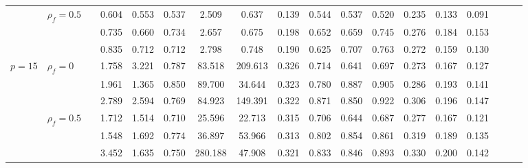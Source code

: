\documentclass[11pt,a4paper]{article}
\theoremstyle{definition}
\begin{document}
\begin{landscape}
\begin{center}
\begin{longtable}{lllccccccccccccccc}
\cmidrule(lr){4-6}\cmidrule(lr){7-9}\cmidrule(lr){10-12}\cmidrule(lr){13-15}
        &  $\rho_f=0.5$ &          &  0.604 &  0.553 &  0.537 &    2.509 &    0.637 &  0.139 &  0.544 &  0.537 &  0.520 &  0.235 &  0.133 &  0.091 \\
        &               &          &  0.735 &  0.660 &  0.734 &    2.657 &    0.675 &  0.198 &  0.652 &  0.659 &  0.745 &  0.276 &  0.184 &  0.153 \\
        &               &          &  0.835 &  0.712 &  0.712 &    2.798 &    0.748 &  0.190 &  0.625 &  0.707 &  0.763 &  0.272 &  0.159 &  0.130 \\
\midrule
$p=15$ &    $\rho_f=0$ &          &  1.758 &  3.221 &  0.787 &   83.518 &  209.613 &  0.326 &  0.714 &  0.641 &  0.697 &  0.273 &  0.167 &  0.127 \\
        &               &          &  1.961 &  1.365 &  0.850 &   89.700 &   34.644 &  0.323 &  0.780 &  0.887 &  0.905 &  0.286 &  0.193 &  0.141 \\
        &               &          &  2.789 &  2.594 &  0.769 &   84.923 &  149.391 &  0.322 &  0.871 &  0.850 &  0.922 &  0.306 &  0.196 &  0.147 \\
\cmidrule(lr){4-6}\cmidrule(lr){7-9}\cmidrule(lr){10-12}\cmidrule(lr){13-15}
        &  $\rho_f=0.5$ &          &  1.712 &  1.514 &  0.710 &   25.596 &   22.713 &  0.315 &  0.706 &  0.644 &  0.687 &  0.277 &  0.167 &  0.121 \\
        &               &          &  1.548 &  1.692 &  0.774 &   36.897 &   53.966 &  0.313 &  0.802 &  0.854 &  0.861 &  0.319 &  0.189 &  0.135 \\
        &               &          &  3.452 &  1.635 &  0.750 &  280.188 &   47.908 &  0.321 &  0.833 &  0.846 &  0.893 &  0.330 &  0.200 &  0.142 \\
\bottomrule
\end{longtable}
\end{center}
\end{landscape}
\end{document}
